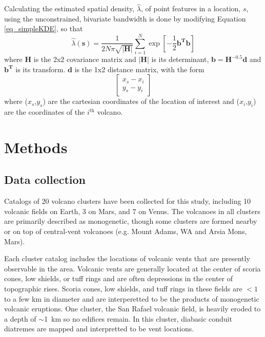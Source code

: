 \documentclass[12pt,letter]{article}
\begin{document}
Calculating the estimated spatial density, $\hat{\lambda}$, of point features in a location, $s$, using the unconstrained, bivariate bandwidth is done by modifying Equation \ref{eq_simpleKDE}, so that
\begin{equation}
\hat{\lambda}(\mathbf{s})=\frac{1}{2N\pi\sqrt{|\mathbf{H}|}}\sum\limits_{i=1}^{N}\exp\left[-\frac{1}{2}\mathbf{b^Tb}\right]
\label{eq_kde}
\end{equation}
where $\mathbf{H}$ is the 2x2 covariance matrix and $|\mathbf{H}|$ is its determinant, $\mathbf{b}=\mathbf{H}^{-0.5}\mathbf{d}$ and $\mathbf{b^T}$ is its transform. $\mathbf{d}$ is the 1x2 distance matrix, with the form
\begin{equation}\begin{bmatrix}
x_s-x_i\\
y_s-y_i
\label{eq_distancematrix}
\end{bmatrix}\end{equation}
where ($x_s$,$y_s$) are the cartesian coordinates of the location of interest and ($x_i$,$y_i$) are the coordinates of the $i^{\text{th}}$ volcano.


\section{Methods}

\subsection{Data collection}
Catalogs of 20 volcano clusters have been collected for this study, including 10 volcanic fields on Earth, 3 on Mars, and 7 on Venus. The volcanoes in all clusters are primarily described as monogenetic, though some clusters are formed nearby or on top of central-vent volcanoes (e.g. Mount Adams, WA and Arsia Mons, Mars). 

Each cluster catalog includes the locations of volcanic vents that are presently observable in the area. Volcanic vents are generally located at the center of scoria cones, low shields, or tuff rings and are often depressions in the center of topographic rises. Scoria cones, low shields, and tuff rings in these fields are $<1$ to a few km in diameter and are interperetted to be the products of monogenetic volcanic eruptions. One cluster, the San Rafael volcanic field, is heavily eroded to a depth of $\sim$1~km so no edifices remain. In this cluster, diabasic conduit diatremes are mapped and interpretted to be vent locations.
\end{document}
